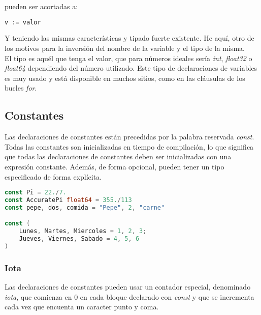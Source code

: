 	pueden ser acortadas a:

\begin{minipage}{17.1cm}
\begin{lstlisting}[language=go,numbers=none]
v := valor
\end{lstlisting}
\end{minipage}

	Y teniendo las mismas características y tipado fuerte existente. He aquí,
	otro de los motivos para la inversión del nombre de la variable y el tipo de
	la misma.\\

	El tipo es aquél que tenga el valor, que para números ideales sería
	\emph{int}, \emph{float32} o \emph{float64} dependiendo del número utilizado. Este tipo de
	declaraciones de variables es muy usado y está disponible en muchos sitios,
	como en las cláusulas de los bucles \emph{for}.

	\subsection{Constantes}

	Las declaraciones de constantes están precedidas por la palabra reservada
	\emph{const}.\\

	Todas las constantes son inicializadas en tiempo de compilación, lo que
	significa que todas las declaraciones de constantes deben ser inicializadas
	con una expresión constante. Además, de forma opcional, pueden tener un tipo
	especificado de forma explícita.

\begin{minipage}{17.1cm}
\begin{lstlisting}[language=go,numbers=none,caption=Declaración de constantes,
label=declconst]
const Pi = 22./7.
const AccuratePi float64 = 355./113
const pepe, dos, comida = "Pepe", 2, "carne"

const (
	Lunes, Martes, Miercoles = 1, 2, 3;
	Jueves, Viernes, Sabado = 4, 5, 6
)
\end{lstlisting}
\end{minipage}

		\subsubsection{Iota}

		Las declaraciones de constantes pueden usar un contador especial,
		denominado \emph{iota}, que comienza en 0 en cada bloque declarado con
		\emph{const} y que se incrementa cada vez que encuenta un caracter
		punto y coma.

